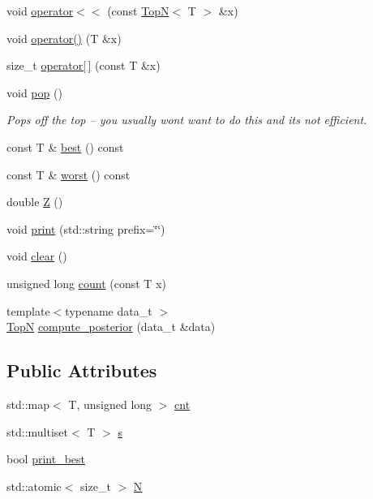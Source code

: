 \begin{DoxyCompactItemize}
\item 
void \hyperlink{class_top_n_a4a4459831455f21c152f99993aa0a274}{operator$<$$<$} (const \hyperlink{class_top_n}{TopN}$<$ T $>$ \&x)
\item 
void \hyperlink{class_top_n_a1bc031e453f4d32cbc4cf6df04da51bc}{operator()} (T \&x)
\item 
size\+\_\+t \hyperlink{class_top_n_a7eafee63f9094086c3193ff005cd9f0f}{operator\mbox{[}$\,$\mbox{]}} (const T \&x)
\item 
void \hyperlink{class_top_n_a7f611b791e96b900e6a2b34432868157}{pop} ()
\begin{DoxyCompactList}\small\item\em Pops off the top -- you usually won\textquotesingle{}t want to do this and it\textquotesingle{}s not efficient. \end{DoxyCompactList}\item 
const T \& \hyperlink{class_top_n_a071e232087705b131627bd8a805d217c}{best} () const
\item 
const T \& \hyperlink{class_top_n_a29d25f1254f2c2e31612004593afa498}{worst} () const
\item 
double \hyperlink{class_top_n_a94191264b36318ce50e32c36018ef104}{Z} ()
\item 
void \hyperlink{class_top_n_a5064ec2e4e9f1defdc3cb62d9b7ddd00}{print} (std\+::string prefix=\char`\"{}\char`\"{})
\item 
void \hyperlink{class_top_n_a1867a08e8be4ffca2f3b6ea8161caa96}{clear} ()
\item 
unsigned long \hyperlink{class_top_n_a8bfb8d5daa31a4fd95196cb41f0ac1ce}{count} (const T x)
\item 
{\footnotesize template$<$typename data\+\_\+t $>$ }\\\hyperlink{class_top_n}{TopN} \hyperlink{class_top_n_a890f0653ac1c56e1af99a0f93dd3224a}{compute\+\_\+posterior} (data\+\_\+t \&data)
\end{DoxyCompactItemize}
\subsection*{Public Attributes}
\begin{DoxyCompactItemize}
\item 
std\+::map$<$ T, unsigned long $>$ \hyperlink{class_top_n_a0b10798cc83ac3b20bfe0dd5f1d45e86}{cnt}
\item 
std\+::multiset$<$ T $>$ \hyperlink{class_top_n_a1fea03a721d2485b03cc38834775c924}{s}
\item 
bool \hyperlink{class_top_n_a90472852f225e5b851446e4b7ced4856}{print\+\_\+best}
\item 
std\+::atomic$<$ size\+\_\+t $>$ \hyperlink{class_top_n_a1a4f701ca7296acfadcb6d0511247fcf}{N}
\end{DoxyCompactItemize}


